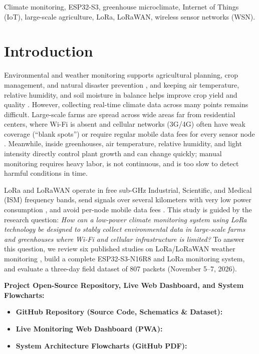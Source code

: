 \documentclass[conference,onecolumn]{IEEEtran}
\begin{document}
\begin{IEEEkeywords}
Climate monitoring, ESP32-S3, greenhouse microclimate, Internet of Things (IoT), large-scale agriculture, LoRa, LoRaWAN, wireless sensor networks (WSN).
\end{IEEEkeywords}

\section{Introduction}
Environmental and weather monitoring supports agricultural planning, crop management, and natural disaster prevention \cite{dajnowski2024, hidayat2019, zennaro2025}, and keeping air temperature, relative humidity, and soil moisture in balance helps improve crop yield and quality \cite{dajnowski2024, hidayat2019, lopez2025}. However, collecting real-time climate data across many points remains difficult. Large-scale farms are spread across wide areas far from residential centers, where Wi-Fi is absent and cellular networks (3G/4G) often have weak coverage (``blank spots'') or require regular mobile data fees for every sensor node \cite{hidayat2019, zennaro2025, lopez2025, pietrosemoli2019}. Meanwhile, inside greenhouses, air temperature, relative humidity, and light intensity directly control plant growth and can change quickly; manual monitoring requires heavy labor, is not continuous, and is too slow to detect harmful conditions in time.

LoRa and LoRaWAN operate in free sub-GHz Industrial, Scientific, and Medical (ISM) frequency bands, send signals over several kilometers with very low power consumption \cite{dajnowski2024, murdyantoro2019}, and avoid per-node mobile data fees \cite{pietrosemoli2019}. This study is guided by the research question: \textit{How can a low-power climate monitoring system using LoRa technology be designed to stably collect environmental data in large-scale farms and greenhouses where Wi-Fi and cellular infrastructure is limited?} To answer this question, we review six published studies on LoRa/LoRaWAN weather monitoring \cite{dajnowski2024, hidayat2019, zennaro2025, lopez2025, pietrosemoli2019, murdyantoro2019}, build a complete ESP32-S3-N16R8 and LoRa monitoring system, and evaluate a three-day field dataset of 807 packets (November 5--7, 2026).

\smallskip
\noindent\textbf{Project Open-Source Repository, Live Web Dashboard, and System Flowcharts:}
\begin{itemize}
    \item \textbf{GitHub Repository (Source Code, Schematics \& Dataset):} \href{https://github.com/iimarky1234/LoRa-Weather-Station.git}{\textbf{\repourl}}
    \item \textbf{Live Monitoring Web Dashboard (PWA):} \href{https://weather.iimarky123.io.vn/}{\textbf{\pwaurl}}
    \item \textbf{System Architecture Flowcharts (GitHub PDF):}\\
    \href{https://github.com/iimarky1234/LoRa-Weather-Station/blob/baaa71d1f1d5a8bfd5d371a7b0f6451495bd53da/docs/FlowChart/System\%20Architecture\%20Flowcharts.pdf}{\resizebox{0.95\linewidth}{!}{\textbf{\flowcharturl}}}
\end{itemize}
\end{document}
